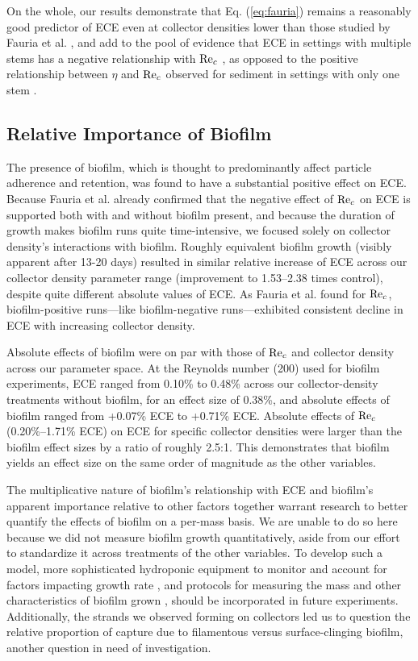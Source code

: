 \documentclass[geosciences,article,submit,moreauthors,pdftex]{Definitions/mdpi}
\begin{document}
On the whole, our results demonstrate that Eq. (\ref{eq:fauria}) remains a reasonably good predictor of ECE even at collector densities lower than those studied by Fauria et al. \cite{Fauria_2015}, and add to the pool of evidence that ECE in settings with multiple stems has a negative relationship with $\mathrm{Re}_c$ \cite{Fauria_2015,purich2006capture,wu2014colloid}, as opposed to the positive relationship between $\eta$ and $\mathrm{Re}_c$ observed for sediment in settings with only one stem \cite{Palmer_2004}.

\subsection{Relative Importance of Biofilm}

The presence of biofilm, which is thought to predominantly affect particle adherence and retention, was found to have a substantial positive effect on ECE. Because Fauria et al. \cite{Fauria_2015} already confirmed that the negative effect of $\mathrm{Re}_c$ on ECE is supported both with and without biofilm present, and because the duration of growth makes biofilm runs quite time-intensive, we focused solely on collector density's interactions with biofilm. Roughly equivalent biofilm growth (visibly apparent after 13-20 days) resulted in similar relative increase of ECE across our collector density parameter range (improvement to 1.53--2.38 times control), despite quite different absolute values of ECE. As Fauria et al. \cite{Fauria_2015} found for $\mathrm{Re}_c$, biofilm-positive runs---like biofilm-negative runs---exhibited consistent decline in ECE with increasing collector density.

Absolute effects of biofilm were on par with those of $\mathrm{Re}_c$ and collector density across our parameter space. At the Reynolds number (200) used for biofilm experiments, ECE ranged from 0.10\% to 0.48\% across our collector-density treatments without biofilm, for an effect size of 0.38\%, and absolute effects of biofilm ranged from +0.07\% ECE to +0.71\% ECE. Absolute effects of $\mathrm{Re}_c$ (0.20\%--1.71\% ECE) on ECE for specific collector densities were larger than the biofilm effect sizes by a ratio of roughly 2.5:1. This demonstrates that biofilm yields an effect size on the same order of magnitude as the other variables.

The multiplicative nature of biofilm's relationship with ECE and biofilm's apparent importance relative to other factors together warrant research to better quantify the effects of biofilm on a per-mass basis. We are unable to do so here because we did not measure biofilm growth quantitatively, aside from our effort to standardize it across treatments of the other variables. To develop such a model, more sophisticated hydroponic equipment to monitor and account for factors impacting growth rate \cite{schnurr2014effect, trulear1982dynamics}, and protocols for measuring the mass and other characteristics of biofilm grown \cite{liu1994simple,characklis1982dynamics}, should be incorporated in future experiments. Additionally, the strands we observed forming on collectors led us to question the relative proportion of capture due to filamentous versus surface-clinging biofilm, another question in need of investigation.
\end{document}
